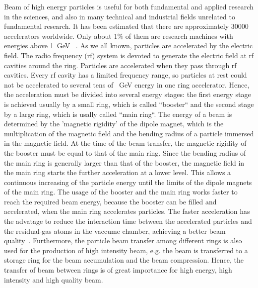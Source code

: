 %

Beam of high energy particles is useful for both fundamental and applied research in the sciences, and also in many technical and industrial fields unrelated to fundamental research. It has been estimated that there are approximately 30000 accelerators worldwide. Only about $1\%$ of them are research machines with energies above \SI{1}{GeV} ~\cite{_particle_????}.  As we all known, particles are accelerated by the electric field. The radio frequency (rf) system is devoted to generate the electric field at rf cavities around the ring. Particles are accelerated when they pass through rf cavities. Every rf cavity has a limited frequency range,  so particles at rest could not be accelerated to several tens of \SI{}{GeV} energy in one ring accelerator.  Hence, the acceleration must be divided into several energy stages: the first energy stage is achieved usually by a small ring, which is called ``booster`` and the second stage by a large ring, which is usally called ``main ring``.  The energy of a beam is determined by the 'magnetic rigidity' of the dipole magnet, which is the multiplication of the magnetic field and the bending radius of a particle immersed in the magnetic field. At the time of the beam transfer, the magnetic rigidity of the booster must be equal to that of the main ring. Since the bending radius of the main ring is generally larger than that of the booster, the magnetic field in the main ring starts the further acceleration at a lower level. This allows a continuous increasing of the particle energy until the limits of the dipole magnets of the main ring. The usage of the booster and the main ring works faster to reach the required beam energy, because the booster can be filled and accelerated, when the main ring accelerates particles. The faster acceleration has the advatage to reduce the interaction time between the accelerated particles and the residual-gas atoms in the vaccume chamber, achieving a better beam quality~\cite{moller_beam-residual_1999}. Furthermore, the particle beam transfer among different rings is also used for the production of high intensity beam, e.g. the beam is transferred to a storage ring for the beam accumulation and the beam compression. Hence, the transfer of beam between rings is of great importance for high energy, high intensity and high quality beam.


